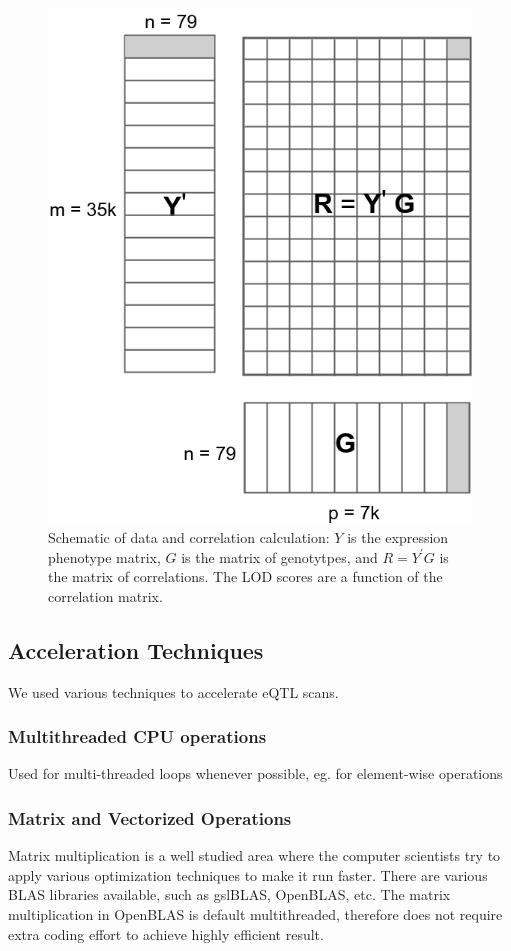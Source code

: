 \documentclass[9pt,twocolumn,twoside,lineno]{gsag3jnl}
\begin{document}
      \begin{figure}[!htb]
	
	\caption{Schematic of data and correlation calculation: $Y$ is
		the expression phenotype matrix, $G$ is the matrix of
		genotytpes, and $R=Y^{\prime}G$ is the matrix of
		correlations.  The LOD scores are a function of the
		correlation matrix.}
	\label{MatrixMult}
	\includegraphics[scale = .4]{figs/YGmatrix.png}
\end{figure}    

\subsection{Acceleration Techniques}
We used various techniques to accelerate eQTL scans. 
\subsubsection{Multithreaded CPU operations}
 Used for multi-threaded loops whenever possible, eg. for element-wise operations
\subsubsection{Matrix and Vectorized Operations}
Matrix multiplication is a well studied area where the computer scientists try to apply various optimization techniques to make it run faster. 
There are various BLAS libraries available, such as gslBLAS, OpenBLAS, etc. 
The matrix multiplication in OpenBLAS is default multithreaded, therefore does not require extra coding effort to achieve highly efficient result. 
 
\end{document}
